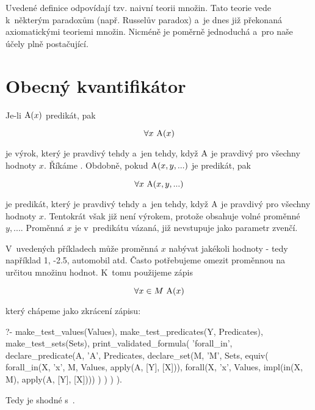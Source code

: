 Uvedené definice odpovídají tzv. naivní teorii množin. Tato teorie vede k~některým paradoxům (např. Russelův paradox) a~je dnes již překonaná axiomatickými teoriemi množin. Nicméně je poměrně jednoduchá a~pro naše účely plně postačující. 

\section{Obecný kvantifikátor}

Je-li \(\mathrm{A}(x)\) predikát, pak

\begin{equation}
\forall x \ \predicate{A}(x)
\end{equation}

je výrok, který je pravdivý tehdy a~jen tehdy, když \(\mathrm{A}\) je pravdivý pro všechny hodnoty \(x\). Říkáme . Obdobně, pokud \(\mathrm{A}(x, y, ...)\) je predikát, pak

\begin{equation}
\forall x \ \mathrm{A}(x, y, ...)
\end{equation}

je predikát, který je pravdivý tehdy a~jen tehdy, když \(\mathrm{A}\) je pravdivý pro všechny hodnoty \(x\). Tentokrát však již není výrokem, protože obsahuje volné proměnné \(y, ...\). Proměnná \(x\) je v~predikátu vázaná, již nevstupuje jako parametr zvenčí.

V~uvedených příkladech může proměnná \(x\) nabývat jakékoli hodnoty - tedy například 1, -2.5, automobil atd. Často potřebujeme omezit proměnnou na určitou množinu hodnot. K~tomu použijeme zápis

\begin{equation}
\forall x \in M \ \predicate{A}(x)
\end{equation}

který chápeme jako zkrácení zápisu:

\begin{prolog}
?- 	make_test_values(Values),
	make_test_predicates(Y, Predicates),
	make_test_sets(Sets),
	print_validated_formula(
		'forall_in',
		declare_predicate(A, 'A', Predicates,
			declare_set(M, 'M', Sets,
				equiv(
					forall_in(X, 'x', M, Values, apply(A, [Y], [X])),
					forall(X, 'x', Values, impl(in(X, M), apply(A, [Y], [X])))
				)
			)
		)
	).
\end{prolog}

Tedy  je shodné s~.


